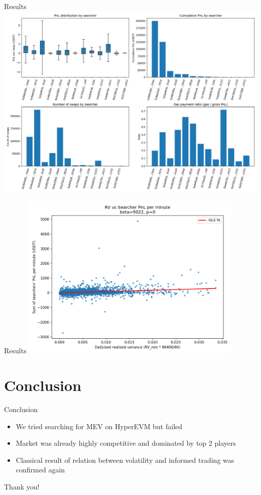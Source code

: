 \documentclass{beamer}
\begin{document}
\begin{frame}{Results}
  \centering
  \includegraphics[height=0.8\textheight]{./images_goal_2/searcher_panels.png}
\end{frame}

\begin{frame}{Results}
  \centering
  \includegraphics[width=0.8\textwidth]{./images_goal_2/rv_vs_searcher_pnl_per_minute.png}
\end{frame}

\section{Conclusion}

\begin{frame}{Conclusion}
  \begin{itemize}
    \item We tried searching for MEV on HyperEVM but failed
    \item Market was already highly competitive and dominated by top 2 players
    \item Classical result of relation between volatility and informed trading was confirmed again
  \end{itemize}
\end{frame}

\begin{frame}
  \centering
  Thank you!
\end{frame}
\end{document}
